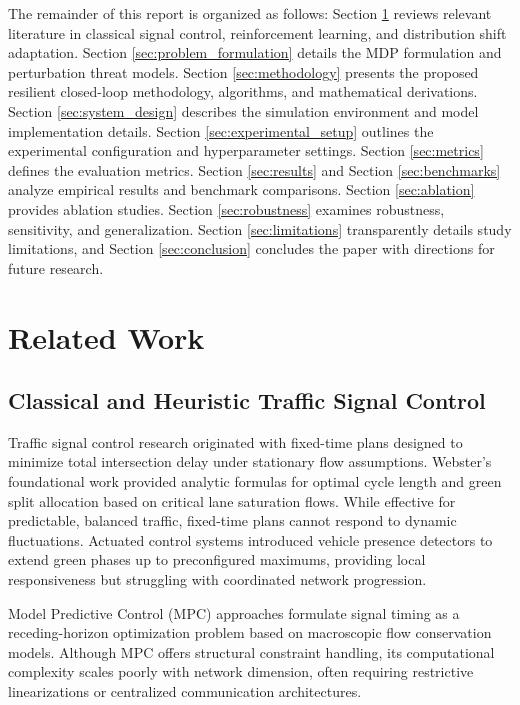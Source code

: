\documentclass{ieeeaccess}
\begin{document}
The remainder of this report is organized as follows: Section \ref{sec:related_work} reviews relevant literature in classical signal control, reinforcement learning, and distribution shift adaptation. Section \ref{sec:problem_formulation} details the MDP formulation and perturbation threat models. Section \ref{sec:methodology} presents the proposed resilient closed-loop methodology, algorithms, and mathematical derivations. Section \ref{sec:system_design} describes the simulation environment and model implementation details. Section \ref{sec:experimental_setup} outlines the experimental configuration and hyperparameter settings. Section \ref{sec:metrics} defines the evaluation metrics. Section \ref{sec:results} and Section \ref{sec:benchmarks} analyze empirical results and benchmark comparisons. Section \ref{sec:ablation} provides ablation studies. Section \ref{sec:robustness} examines robustness, sensitivity, and generalization. Section \ref{sec:limitations} transparently details study limitations, and Section \ref{sec:conclusion} concludes the paper with directions for future research.

\section{Related Work}
\label{sec:related_work}

\subsection{Classical and Heuristic Traffic Signal Control}
Traffic signal control research originated with fixed-time plans designed to minimize total intersection delay under stationary flow assumptions. Webster's foundational work \cite{webster1958traffic} provided analytic formulas for optimal cycle length and green split allocation based on critical lane saturation flows. While effective for predictable, balanced traffic, fixed-time plans cannot respond to dynamic fluctuations. Actuated control systems \cite{koonce2008traffic} introduced vehicle presence detectors to extend green phases up to preconfigured maximums, providing local responsiveness but struggling with coordinated network progression.

Model Predictive Control (MPC) approaches \cite{wongpiromsarn2012distributed} formulate signal timing as a receding-horizon optimization problem based on macroscopic flow conservation models. Although MPC offers structural constraint handling, its computational complexity scales poorly with network dimension, often requiring restrictive linearizations or centralized communication architectures.
\end{document}
